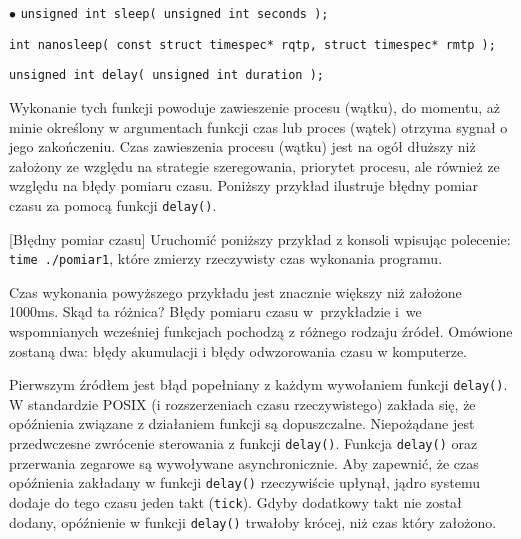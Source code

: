 \begin{myitemize}
\item[$\bullet$] \lstinline[style=MyCStyle]{unsigned int sleep( unsigned int seconds );}
\item[$\bullet$] \lstinline[style=MyCStyle]{int nanosleep( const struct timespec* rqtp, struct timespec* rmtp );}
\item[$\bullet$] \lstinline[style=MyCStyle]{unsigned int delay( unsigned int duration );}
\end{myitemize}

Wykonanie tych funkcji powoduje zawieszenie procesu (wątku), do momentu, aż minie określony w argumentach funkcji czas lub proces (wątek) otrzyma sygnał o jego zakończeniu. Czas zawieszenia procesu (wątku) jest na ogół dłuższy niż założony ze względu na strategie szeregowania, priorytet procesu, ale również ze względu na błędy pomiaru czasu. Poniższy przykład ilustruje błędny pomiar czasu za pomocą funkcji \lstinline[style=MyCStyle]{delay()}.

\begin{example}{[Błędny pomiar czasu]} Uruchomić poniższy przykład z konsoli wpisując polecenie: \lstinline[style=MyCStyle]{time ./pomiar1}, które zmierzy rzeczywisty czas wykonania programu.

\end{example}

Czas wykonania powyższego przykładu jest znacznie większy niż założone 1000ms. Skąd ta różnica? Błędy pomiaru czasu w~przykładzie i~we wspomnianych wcześniej funkcjach pochodzą z różnego rodzaju źródeł. Omówione zostaną dwa: błędy akumulacji i błędy odwzorowania czasu w komputerze.

Pierwszym źródłem jest błąd popełniany z każdym wywołaniem funkcji \lstinline[style=MyCStyle]{delay()}. W standardzie POSIX (i rozszerzeniach czasu rzeczywistego) zakłada się, że opóźnienia związane z działaniem funkcji są dopuszczalne. Niepożądane jest przedwczesne zwrócenie sterowania z funkcji \lstinline[style=MyCStyle]{delay()}. Funkcja \lstinline[style=MyCStyle]{delay()} oraz przerwania zegarowe są wywoływane asynchronicznie. Aby zapewnić, że czas opóźnienia zakładany w funkcji \lstinline[style=MyCStyle]{delay()} rzeczywiście upłynął, jądro systemu dodaje do tego czasu jeden takt (\lstinline[style=MyCStyle]{tick}). Gdyby dodatkowy takt nie został dodany, opóźnienie w funkcji \lstinline[style=MyCStyle]{delay()} trwałoby krócej, niż czas który założono.

